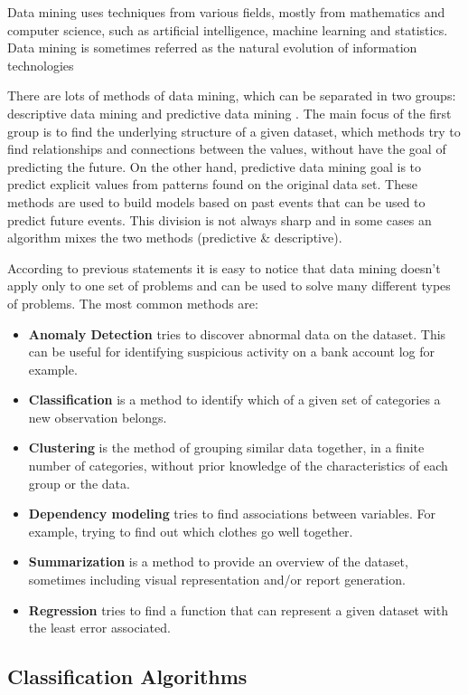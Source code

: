 Data mining uses techniques from various fields, mostly from mathematics and computer science,
such as artificial intelligence, machine learning and statistics.
Data mining is sometimes referred as the natural evolution of information technologies \cite[p. 1]{HanKam06}

There are lots of methods of data mining, which can be separated in two groups: descriptive data mining and predictive
data mining \cite{Fayyad96knowledgediscovery}.
The main focus of the first group is to find the underlying structure of a given dataset, which methods try to find relationships and connections
between the values, without have the goal of predicting the future. On the other hand,
predictive data mining goal is to predict explicit values from patterns found on the original data set. These methods are used to build models based on past
events that can be used to predict future events.
This division is not always sharp and in some cases an algorithm mixes the two methods (predictive \& descriptive)\cite{Fayyad96knowledgediscovery}.

According to previous statements it is easy to notice that data mining doesn't apply only to one set of problems and can be used to solve many different types of
problems. The most common methods are:
\begin{itemize}
\item \textbf{Anomaly Detection} tries to discover abnormal data on the dataset. This can be useful for identifying suspicious activity on a bank
account log for example.
\item \textbf{Classification} is a method to identify which of a given set of categories a new observation belongs.
\item \textbf{Clustering} is the method of grouping similar data together, in a finite number of categories, without prior knowledge of
the characteristics of each group or the data.
\item \textbf{Dependency modeling} tries to find associations between variables. For example, trying to find out which clothes go well together.
\item \textbf{Summarization} is a method to provide an overview of the dataset, sometimes including visual representation and/or report generation.
\item \textbf{Regression} tries to find a function that can represent a given dataset with the least error associated.
\end{itemize}

\subsection{Classification Algorithms}\label{sec:classification}

